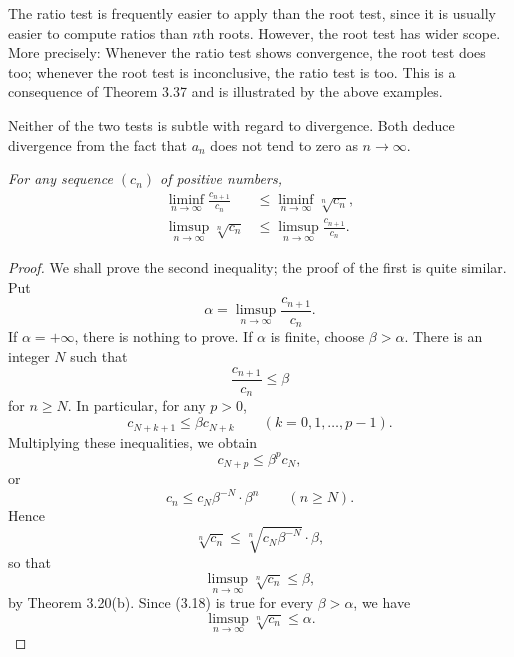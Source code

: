 The ratio test is frequently easier to apply than the root test, since it is
usually easier to compute ratios than $n$th roots. However, the root test has
wider scope. More precisely: Whenever the ratio test shows convergence, the
root test does too; whenever the root test is inconclusive, the ratio test is
too. This is a consequence of Theorem 3.37 and is illustrated by the above
examples.

Neither of the two tests is subtle with regard to divergence. Both deduce
divergence from the fact that $a_n$ does not tend to zero as $n \to \infty$.

\emph{For any sequence $(c_n)$ of positive numbers,}
\begin{align*}
  \liminf_{n\to\infty} \frac{c_{n+1}}{c_n}
    &\le \liminf_{n\to\infty} \sqrt[n]{c_n},\\
  \limsup_{n\to\infty} \sqrt[n]{c_n}
    &\le \limsup_{n\to\infty} \frac{c_{n+1}}{c_n}.
\end{align*}

\begin{proof}
We shall prove the second inequality; the proof of the first is quite similar.
Put
\[ \alpha = \limsup_{n\to\infty} \frac{c_{n+1}}{c_n}. \]
If $\alpha = +\infty$, there is nothing to prove. If $\alpha$ is finite, choose
$\beta > \alpha$. There is an integer $N$ such that
\[ \frac{c_{n+1}}{c_n} \le \beta \]
for $n \ge N$. In particular, for any $p > 0$,
\[ c_{N+k+1} \le \beta c_{N+k} \qquad (k = 0,1,\dots,p-1). \]
Multiplying these inequalities, we obtain
\[ c_{N+p} \le \beta^pc_N, \]
or
\[ c_n \le c_N\beta^{-N}\cdot\beta^n \qquad (n \ge N). \]
Hence
\[ \sqrt[n]{c_n} \le \sqrt[n]{c_N\beta^{-N}}\cdot\beta, \]
so that
\begin{equation}
  \limsup_{n\to\infty} \sqrt[n]{c_n} \le \beta, \tag{3.18}
\end{equation}
by Theorem 3.20(b). Since (3.18) is true for every $\beta > \alpha$, we have
\[ \limsup_{n\to\infty} \sqrt[n]{c_n} \le \alpha. \]
\end{proof}

